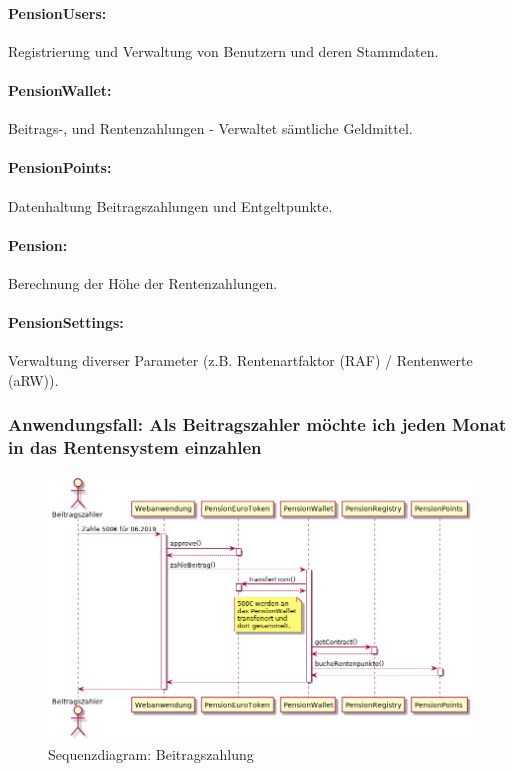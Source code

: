 \paragraph*{PensionUsers:} Registrierung und Verwaltung von Benutzern und deren Stammdaten.

\paragraph*{PensionWallet:} Beitrags-, und Rentenzahlungen - Verwaltet sämtliche Geldmittel.


\paragraph*{PensionPoints:} Datenhaltung Beitragszahlungen und Entgeltpunkte.

\paragraph*{Pension:} Berechnung der Höhe der Rentenzahlungen.

\paragraph*{PensionSettings:} Verwaltung diverser Parameter (z.B. Rentenartfaktor (RAF) / Rentenwerte (aRW)).

\subsubsection{Anwendungsfall: Als Beitragszahler möchte ich jeden Monat in das Rentensystem einzahlen}

\begin{figure}[H]
    \centering
    \includegraphics[width=6.0in]{images/usecase-pay.png}
    \caption{Sequenzdiagram: Beitragszahlung}
    \label{fig:asure_architecture}
\end{figure}

